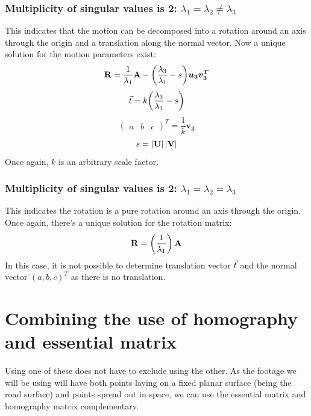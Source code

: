 \subsubsection{Multiplicity of singular values is 2: $\lambda_1 = \lambda_2 \neq \lambda_3$}
This indicates that the motion can be decomposed into a rotation around an axis through the origin and a translation along the normal vector. Now a unique solution for the motion parameters exist:
\begin{equation*}
    \mathbf{R} = \frac{1}{\lambda_1}\mathbf{A}-\biggl(\frac{\lambda_3}{\lambda_1}-s\biggr)\boldsymbol{u_3}\boldsymbol{v_3^T}
\end{equation*}
\begin{equation*}
    \vec t = k\biggl(\frac{\lambda_3}{\lambda_1}-s\biggr)
\end{equation*}
\begin{equation*}
    \begin{pmatrix}
        a & b & c
    \end{pmatrix}^T = \frac{1}{k}\boldsymbol{v_3}
\end{equation*}
\begin{equation*}
    s = \left| {\mathbf{U}} \right| \left| {\mathbf{V}} \right|
\end{equation*}
Once again, $k$ is an arbitrary scale factor.
\subsubsection{Multiplicity of singular values is 2: $\lambda_1 = \lambda_2 = \lambda_3$}
This indicates the rotation is a pure rotation around an axis through the origin. Once again, there's a unique solution for the rotation matrix:
\begin{equation*}
    \mathbf{R} = \left(\frac{1}{\lambda_1}\right)\mathbf{A}
\end{equation*}
In this case, it is not possible to determine translation vector $\vec t$ and the normal vector $(a, b, c)^T$ as there is no translation.

\section{Combining the use of homography and essential matrix}
Using one of these does not have to exclude using the other. As the footage we will be using will have both points laying on a fixed planar surface (being the road surface) and points spread out in space, we can use the essential matrix and homography matrix complementary.
